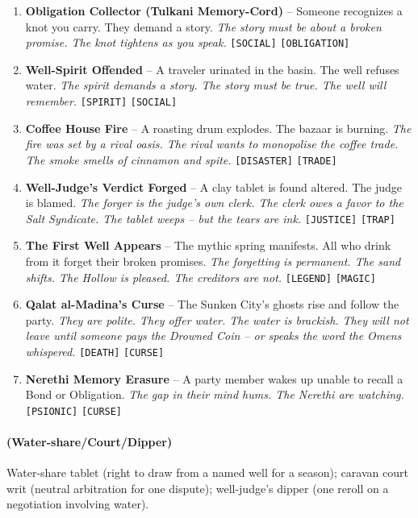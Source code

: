 \begin{enumerate}
\item \textbf{Obligation Collector (Tulkani Memory-Cord)} -- Someone recognizes a knot you carry. They demand a story.
  \hfill \textit{The story must be about a broken promise. The knot tightens as you speak.} \texttt{[SOCIAL]} \texttt{[OBLIGATION]}
\item[J] \textbf{Well-Spirit Offended} -- A traveler urinated in the basin. The well refuses water.
  \hfill \textit{The spirit demands a story. The story must be true. The well will remember.} \texttt{[SPIRIT]} \texttt{[SOCIAL]}
\item[Q] \textbf{Coffee House Fire} -- A roasting drum explodes. The bazaar is burning.
  \hfill \textit{The fire was set by a rival oasis. The rival wants to monopolise the coffee trade. The smoke smells of cinnamon and spite.} \texttt{[DISASTER]} \texttt{[TRADE]}
\item[K] \textbf{Well-Judge's Verdict Forged} -- A clay tablet is found altered. The judge is blamed.
  \hfill \textit{The forger is the judge's own clerk. The clerk owes a favor to the Salt Syndicate. The tablet weeps -- but the tears are ink.} \texttt{[JUSTICE]} \texttt{[TRAP]}
\item[A] \textbf{The First Well Appears} -- The mythic spring manifests. All who drink from it forget their broken promises.
  \hfill \textit{The forgetting is permanent. The sand shifts. The Hollow is pleased. The creditors are not.} \texttt{[LEGEND]} \texttt{[MAGIC]}
\item[A+] \textbf{Qalat al-Madina's Curse} -- The Sunken City's ghosts rise and follow the party.
  \hfill \textit{They are polite. They offer water. The water is brackish. They will not leave until someone pays the Drowned Coin -- or speaks the word the Omens whispered.} \texttt{[DEATH]} \texttt{[CURSE]}
\item[N] \textbf{Nerethi Memory Erasure} -- A party member wakes up unable to recall a Bond or Obligation.
  \hfill \textit{The gap in their mind hums. The Nerethi are watching.} \texttt{[PSIONIC]} \texttt{[CURSE]}
\end{enumerate}

\paragraph*{(Water-share/Court/Dipper)} Water-share tablet (right to draw from a named well for a season); caravan court writ (neutral arbitration for one dispute); well-judge's dipper (one reroll on a negotiation involving water).

